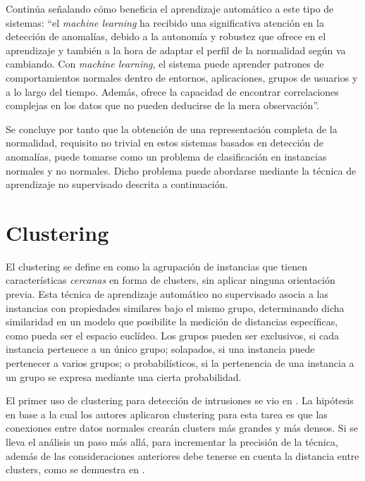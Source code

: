 Continúa señalando cómo beneficia el aprendizaje automático a este tipo de sistemas: ``el \emph{machine learning} ha recibido una significativa atención en la detección de anomalías, debido a
la autonomía y robustez que ofrece en el aprendizaje y también a la hora de adaptar el perfil de la normalidad según va cambiando.
Con \emph{machine learning}, el sistema puede aprender patrones de comportamientos normales dentro de entornos, aplicaciones, grupos de usuarios y a lo largo del tiempo.
Además, ofrece la capacidad de encontrar correlaciones complejas en los datos que no pueden deducirse de la mera observación''.

Se concluye por tanto que la obtención de una representación completa de la normalidad, requisito no trivial en estos sistemas basados en detección de anomalías, puede tomarse como un problema de clasificación en instancias normales y no normales.
Dicho problema puede abordarse mediante la técnica de aprendizaje no supervisado descrita a continuación.

\section{Clustering}\label{clustering}

El clustering se define en \cite{NA08} como la agrupación de instancias que tienen características \emph{cercanas} en forma de clusters, sin aplicar ninguna orientación previa.
Esta técnica de aprendizaje automático no supervisado asocia a las instancias con propiedades similares bajo el mismo grupo,
determinando dicha similaridad en un modelo que posibilite la medición de distancias específicas, como pueda ser el espacio euclídeo.
Los grupos pueden ser exclusivos, si cada instancia pertenece a un único grupo; solapados, si una instancia puede pertenecer a varios grupos; o probabilísticos, si la pertenencia de una instancia a un grupo se expresa mediante una cierta probabilidad.

El primer uso de clustering para detección de intrusiones se vio en \cite{Portnoy_2000}.
La hipótesis en base a la cual los autores aplicaron clustering para esta tarea es que las conexiones entre datos normales crearán clusters más grandes y más densos.
Si se lleva el análisis un paso más allá, para incrementar la precisión de la técnica, además de las consideraciones anteriores debe tenerse en cuenta la distancia entre clusters, como se demuestra en \cite{JSW+06}.

